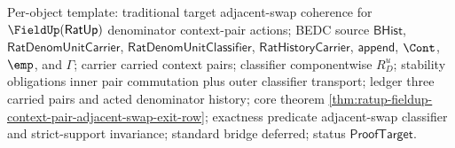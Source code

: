 Per-object template: traditional target adjacent-swap coherence for
$\FieldUp(\mathsf{RatUp})$ denominator context-pair actions; BEDC source
$\mathsf{BHist}$, $\mathsf{RatDenomUnitCarrier}$,
$\mathsf{RatDenomUnitClassifier}$, $\mathsf{RatHistoryCarrier}$,
$\mathsf{append}$, $\Cont$, $\emp$, and $\Gamma$; carrier carried context pairs;
classifier componentwise $R_D^u$; stability obligations inner pair commutation
plus outer classifier transport; ledger three carried pairs and acted
denominator history; core theorem
\autoref{thm:ratup-fieldup-context-pair-adjacent-swap-exit-row}; exactness
predicate adjacent-swap classifier and strict-support invariance; standard
bridge deferred; status $\mathsf{ProofTarget}$.
